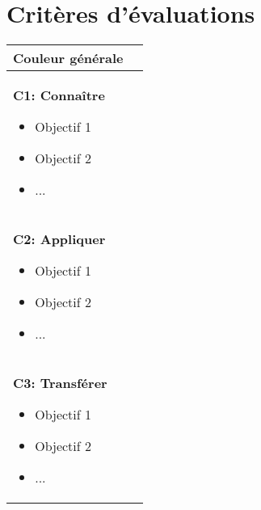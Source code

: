 \section*{Critères d'évaluations}


 
\begin{tabularx}{\textwidth}{|p{}|X|}
\hline
\large Couleur générale & \\
\hline
\textbf{C1: Connaître}
\begin{itemize}
    \item Objectif 1
    \item Objectif 2
    \item ...
\end{itemize} & \\
\hline
\textbf{C2: Appliquer}
\begin{itemize}
    \item Objectif 1
    \item Objectif 2
    \item ...
\end{itemize} & \\
\hline
\textbf{C3: Transférer}
\begin{itemize}
    \item Objectif 1
    \item Objectif 2
    \item ...
\end{itemize} & \\
\hline
\end{tabularx}